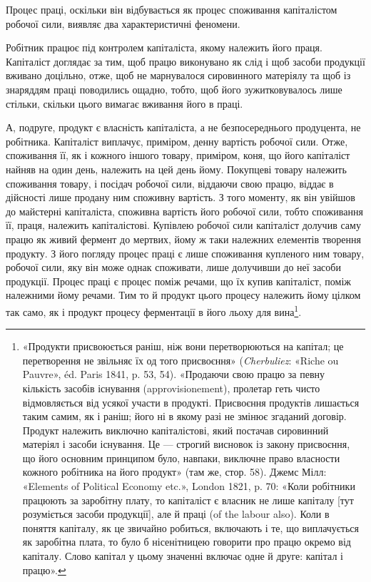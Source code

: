 
Процес праці, оскільки він відбувається як процес споживання
капіталістом робочої сили, виявляє два характеристичні феномени.

Робітник працює під контролем капіталіста, якому належить
його праця. Капіталіст доглядає за тим, щоб працю виконувано
як слід і щоб засоби продукції вживано доцільно, отже, щоб не
марнувалося сировинного матеріялу та щоб із знаряддям праці
поводились ощадно, тобто, щоб його зужитковувалось лише
стільки, скільки цього вимагає вживання його в праці.

А, подруге, продукт є власність капіталіста, а не безпосереднього
продуцента, не робітника. Капіталіст виплачує, приміром,
денну вартість робочої сили. Отже, споживання її, як і кожного
іншого товару, приміром, коня, що його капіталіст найняв на
один день, належить на цей день йому. Покупцеві товару належить
споживання товару, і посідач робочої сили, віддаючи свою
працю, віддає в дійсності лише продану ним споживну вартість.
З того моменту, як він увійшов до майстерні капіталіста, споживна
вартість його робочої сили, тобто споживання її, праця, належить
капіталістові. Купівлею робочої сили капіталіст долучив саму
працю як живий фермент до мертвих, йому ж таки належних
елементів творення продукту. З його погляду процес праці є
лише споживання купленого ним товару, робочої сили, яку він
може однак споживати, лише долучивши до неї засоби продукції.
Процес праці є процес поміж речами, що їх купив капіталіст,
поміж належними йому речами. Тим то й продукт цього процесу
належить йому цілком так само, як і продукт процесу ферментації
в його льоху для вина\footnote{
«Продукти присвоюється раніш, ніж вони перетворюються на
капітал; це перетворення не звільняє їх од того присвоєння» (\emph{Cherbuliez}:
«Riche ou Pauvre», éd. Paris 1841, p. 53, 54). «Продаючи свою
працю за певну кількість засобів існування (approvisionement), пролетар
геть чисто відмовляється від усякої участи в продукті. Присвоєння продуктів
лишається таким самим, як і раніш; його ні в якому разі не змінює
згаданий договір. Продукт належить виключно капіталістові, який постачав
сировинний матеріял і засоби існування. Це — строгий висновок
із закону присвоєння, що його основним принципом було, навпаки, виключне
право власности кожного робітника на його продукт» (там же,
стор. 58). Джемс Мілл: «Elements of Political Economy etc.», London
1821, p. 70: «Коли робітники працюють за заробітну плату, то капіталіст
є власник не лише капіталу [тут розуміється засоби продукції], але
й праці (of the labour also). Коли в поняття капіталу, як це звичайно
робиться, включають і те, що виплачується як заробітна плата, то було б
нісенітницею говорити про працю окремо від капіталу. Слово капітал у
цьому значенні включає одне й друге: капітал і працю».
}.

